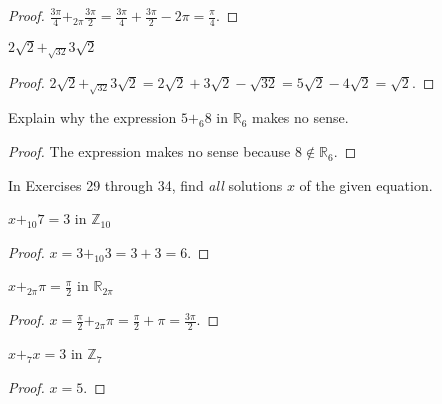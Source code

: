 \begin{proof}
    $\frac{3\pi}{4} {+}_{2\pi} \frac{3\pi}{2} = \frac{3\pi}{4} + \frac{3\pi}{2} - 2\pi = \frac{\pi}{4}$.
\end{proof}

\newpage
\begin{exercise}
    $2\sqrt{2} {+}_{\sqrt{32}} 3\sqrt{2}$
\end{exercise}

\begin{proof}
    $2\sqrt{2} {+}_{\sqrt{32}} 3\sqrt{2} = 2\sqrt{2} + 3\sqrt{2} - \sqrt{32} = 5\sqrt{2} - 4\sqrt{2} = \sqrt{2}$.
\end{proof}

\newpage
\begin{exercise}
    Explain why the expression $5 {+}_{6} 8$ in $\mathbb{R}_{6}$ makes no sense.
\end{exercise}

\begin{proof}
    The expression makes no sense because $8\notin \mathbb{R}_{6}$.
\end{proof}

In Exercises 29 through 34, find \textit{all} solutions $x$ of the given equation.

\newpage
\begin{exercise}
    $x {+}_{10} 7 = 3$ in $\mathbb{Z}_{10}$
\end{exercise}

\begin{proof}
    $x = 3 {+}_{10} 3 = 3 + 3 = 6$.
\end{proof}

\newpage
\begin{exercise}
    $x {+}_{2\pi} \pi = \frac{\pi}{2}$ in $\mathbb{R}_{2\pi}$
\end{exercise}

\begin{proof}
    $x = \frac{\pi}{2} {+}_{2\pi} \pi = \frac{\pi}{2} + \pi = \frac{3\pi}{2}$.
\end{proof}

\newpage
\begin{exercise}
    $x {+}_{7} x = 3$ in $\mathbb{Z}_{7}$
\end{exercise}

\begin{proof}
    $x = 5$.
\end{proof}

